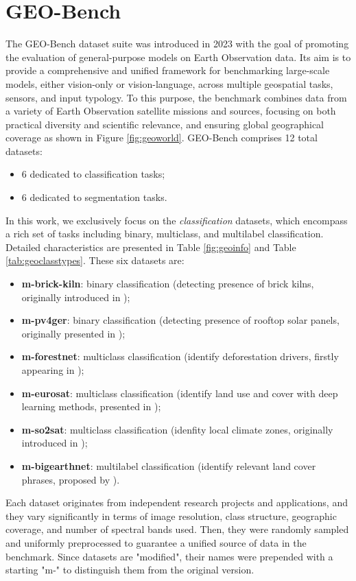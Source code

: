 \documentclass[a4paper, oneside, english]{sapthesis} %
\begin{document}
\section{GEO-Bench}

The GEO-Bench dataset suite \cite{lacoste2023geo} was introduced in 2023 with the goal of promoting the evaluation of general-purpose models on Earth Observation data. Its aim is to provide a comprehensive and unified framework for benchmarking large-scale models, either vision-only or vision-language, across multiple geospatial tasks, sensors, and input typology. To this purpose, the benchmark combines data from a variety of Earth Observation satellite missions and sources, focusing on both practical diversity and scientific relevance, and ensuring global geographical coverage as shown in Figure \ref{fig:geoworld}. GEO-Bench comprises 12 total datasets:
\begin{itemize}
    \item 6 dedicated to classification tasks;
    \item 6 dedicated to segmentation tasks.
\end{itemize}
In this work, we exclusively focus on the \emph{classification} datasets, which encompass a rich set of tasks including binary, multiclass, and multilabel classification. Detailed characteristics are presented in Table \ref{fig:geoinfo} and Table \ref{tab:geoclasstypes}. These six datasets are:
\begin{itemize}
    \item \textbf{m-brick-kiln}: binary classification (detecting presence of brick kilns, originally introduced in \cite{lee2021scalable});
    \item \textbf{m-pv4ger}: binary classification (detecting presence of rooftop solar panels, originally presented in \cite{mayer20223d});
    \item \textbf{m-forestnet}: multiclass classification (identify deforestation drivers, firstly appearing in \cite{irvin2020forestnet});
    \item \textbf{m-eurosat}: multiclass classification (identify land use and cover with deep learning methods, presented in \cite{helber2019eurosat});
    \item \textbf{m-so2sat}: multiclass classification (idenfity local climate zones, originally introduced in  \cite{zhu2019so2sat});
    \item \textbf{m-bigearthnet}: multilabel classification (identify relevant land cover phrases, proposed by \cite{sumbul2021bigearthnet}).
\end{itemize}
Each dataset originates from independent research projects and applications, and they vary significantly in terms of image resolution, class structure, geographic coverage, and number of spectral bands used. Then, they were randomly sampled and uniformly preprocessed to guarantee a unified source of data in the benchmark. Since datasets are "modified", their names were prepended with a starting "m-" to distinguish them from the original version.
\end{document}
